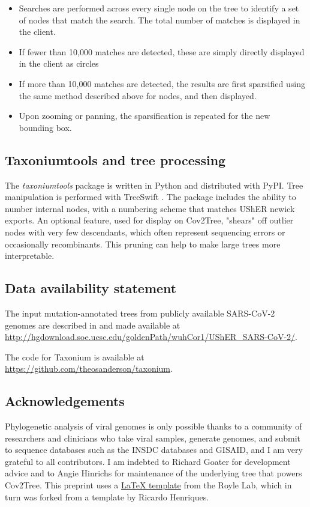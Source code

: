 \documentclass[twocolumn]{bioRxiv}
\begin{document}
\begin{itemize}
   
\item Searches are performed across every single node on the tree to identify a set of nodes that match the search. The total number of matches is displayed in the client.
\item If fewer than 10,000 matches are detected, these are simply directly displayed in the client as circles
\item If more than 10,000 matches are detected, the results are first sparsified using the same method described above for nodes, and then displayed. 
\item Upon zooming or panning, the sparsification is repeated for the new bounding box.
\end{itemize}



\subsection*{Taxoniumtools and tree processing}
The \emph{taxoniumtools} package is written in Python and distributed with PyPI. Tree manipulation is performed with TreeSwift \citep{moshiri2020treeswift}. The package includes the ability to number internal nodes, with a numbering scheme that matches UShER newick exports. An optional feature, used for display on Cov2Tree, "shears" off outlier nodes with very few descendants, which often represent sequencing errors or occasionally recombinants. This pruning can help to make large trees more interpretable.


\small

\subsection*{Data availability statement}

The input mutation-annotated trees from publicly available SARS-CoV-2 genomes are described in \cite{McBroome2021} and made available at \url{http://hgdownload.soe.ucsc.edu/goldenPath/wuhCor1/UShER_SARS-CoV-2/}.

The code for Taxonium is available at \url{https://github.com/theosanderson/taxonium}.


\subsection*{Acknowledgements}

Phylogenetic analysis of viral genomes is only possible thanks to a community of researchers and clinicians who take viral samples, generate genomes, and submit to sequence databases such as the INSDC databases and GISAID, and I am very grateful to all contributors. I am indebted to Richard Goater for development advice and to Angie Hinrichs for maintenance of the underlying tree that powers Cov2Tree. This preprint uses a \href{https://github.com/roylelab/manuscript-templates}{LaTeX template} from the Royle Lab, which in turn was forked from a template by Ricardo Henriques.
\end{document}
